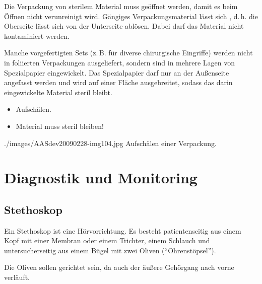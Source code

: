 {
Die Verpackung von sterilem Material muss  geöffnet werden, damit
es beim Öffnen nicht verunreinigt wird. Gängiges Verpackungsmaterial lässt sich
, d.\,h. die Oberseite lässt sich von der Unterseite ablösen.
Dabei darf das Material nicht kontaminiert werden. 

Manche vorgefertigten Sets (z.\,B. für diverse chirurgische Eingriffe) werden
nicht in foliierten Verpackungen ausgeliefert, sondern sind in mehrere Lagen von
Spezialpapier eingewickelt. Das Spezialpapier darf nur an der Außenseite
angefasst werden und wird auf einer Fläche ausgebreitet, sodass das darin
eingewickelte Material steril bleibt. 
}
{
\begin{itemize}
  \item Aufschälen. 
  \item Material muss steril bleiben!
\end{itemize}
}
{./images/AASdev20090228-img104.jpg}
{Aufschälen einer Verpackung.}
{}





\section{Diagnostik und Monitoring}


\subsection{Stethoskop}

{
Ein Stethoskop ist eine Hörvorrichtung. Es besteht patientenseitig aus einem
Kopf mit einer Membran oder einem Trichter, einem Schlauch und
untersucherseitig aus einem Bügel mit zwei Oliven ("`Ohrenstöpsel"'). 

Die Oliven sollen  gerichtet sein, da auch der äußere Gehörgang
nach vorne verläuft.
}{}{}{}{}

